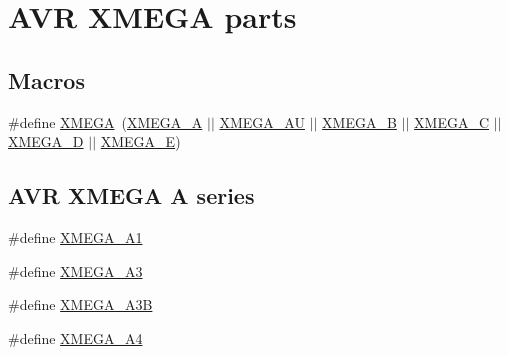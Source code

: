 \hypertarget{group__xmega__part__macros__group}{\section{A\-V\-R X\-M\-E\-G\-A parts}
\label{group__xmega__part__macros__group}
}
\subsection*{Macros}
\begin{DoxyCompactItemize}
\item 
\#define \hyperlink{group__xmega__part__macros__group_ga959bff90afbae437308a52eeb67b3368}{X\-M\-E\-G\-A}~(\hyperlink{group__xmega__part__macros__group_gab903a90d3a0bc99d7248eaecbb325a23}{X\-M\-E\-G\-A\-\_\-\-A} $|$$|$ \hyperlink{group__xmega__part__macros__group_ga55210f3805902072fce76647b50fa177}{X\-M\-E\-G\-A\-\_\-\-A\-U} $|$$|$ \hyperlink{group__xmega__part__macros__group_ga62f2c1c93640237425cb64186ddce219}{X\-M\-E\-G\-A\-\_\-\-B} $|$$|$ \hyperlink{group__xmega__part__macros__group_ga75b06dd59d29b1de54dd73fe67830973}{X\-M\-E\-G\-A\-\_\-\-C} $|$$|$ \hyperlink{group__xmega__part__macros__group_gacc9e4b074c3f87ce7b461483b0beb15c}{X\-M\-E\-G\-A\-\_\-\-D} $|$$|$ \hyperlink{group__xmega__part__macros__group_gaab6d2543c5128fca0b1aeecb5c080723}{X\-M\-E\-G\-A\-\_\-\-E})
\end{DoxyCompactItemize}
\subsection*{A\-V\-R X\-M\-E\-G\-A A series}
\begin{DoxyCompactItemize}
\item 
\#define \hyperlink{group__xmega__part__macros__group_gaa0df665226b6faf69dcc137f1b78f074}{X\-M\-E\-G\-A\-\_\-\-A1}
\item 
\#define \hyperlink{group__xmega__part__macros__group_ga831948bd467aa2355eb76ec708d2921a}{X\-M\-E\-G\-A\-\_\-\-A3}
\item 
\#define \hyperlink{group__xmega__part__macros__group_ga32fef354d7f092b04ec41a0733e2c7ae}{X\-M\-E\-G\-A\-\_\-\-A3\-B}
\item 
\#define \hyperlink{group__xmega__part__macros__group_ga7b83a133489c9896dbdc730615c83be8}{X\-M\-E\-G\-A\-\_\-\-A4}
\end{DoxyCompactItemize}
